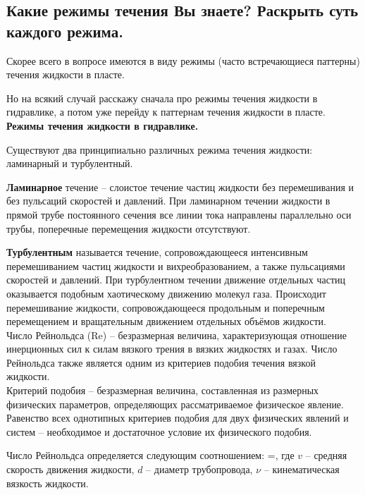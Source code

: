 

\subsection{Какие режимы течения Вы знаете? Раскрыть суть каждого режима.}

Скорее всего в вопросе имеются в виду режимы (часто встречающиеся паттерны) течения жидкости в пласте.

Но на всякий случай расскажу сначала про режимы течения жидкости в гидравлике, а потом уже перейду к паттернам течения жидкости в пласте.
\\

\textbf{Режимы течения жидкости в гидравлике.}

Существуют два принципиально различных режима течения жидкости: ламинарный и турбулентный.

\textbf{Ламинарное} течение -- слоистое течение частиц жидкости без перемешивания и без пульсаций скоростей и давлений.
При ламинарном течении жидкости в прямой трубе постоянного сечения все линии тока направлены параллельно оси трубы, поперечные перемещения жидкости отсутствуют.

\textbf{Турбулентным} называется течение, сопровождающееся интенсивным перемешиванием частиц жидкости и вихреобразованием, а также пульсациями скоростей и давлений.
При турбулентном течении движение отдельных частиц оказывается подобным хаотическому движению молекул газа.
Происходит перемешивание жидкости, сопровождающееся продольным и поперечным перемещением и вращательным движением отдельных объёмов жидкости.
\\

Число Рейнольдса (Re) -- безразмерная величина, характеризующая отношение инерционных сил к силам вязкого трения в вязких жидкостях и газах.
Число Рейнольдса также является одним из критериев подобия течения вязкой жидкости.
\\

Критерий подобия -- безразмерная величина, составленная из размерных физических параметров, определяющих рассматриваемое физическое явление.
Равенство всех однотипных критериев подобия для двух физических явлений и систем -- необходимое и достаточное условие их физического подобия.

Число Рейнольдса определяется следующим соотношением:
\beq
{}=,
\eeq
где $v$ -- средняя скорость движения жидкости, $d$ -- диаметр трубопровода, $\nu$ -- кинематическая вязкость жидкости.
\\

